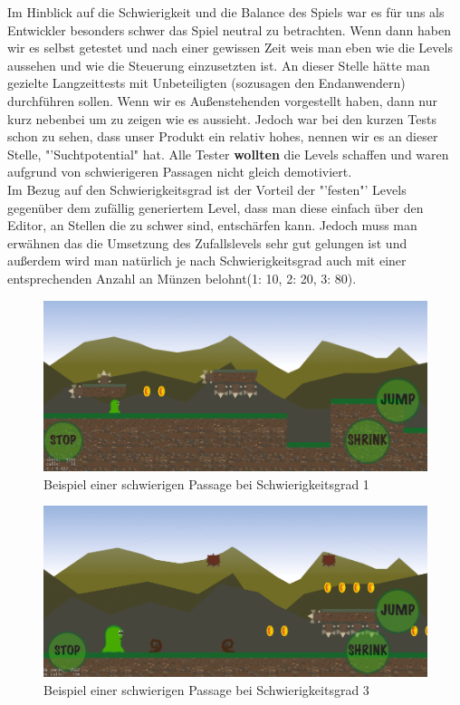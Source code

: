 Im Hinblick auf die Schwierigkeit und die Balance des Spiels war es für uns als Entwickler besonders schwer das Spiel neutral zu betrachten. Wenn dann haben wir es selbst getestet und nach einer gewissen Zeit weis man eben wie die Levels aussehen und wie die Steuerung einzusetzten ist. An dieser Stelle hätte man gezielte Langzeittests mit Unbeteiligten (sozusagen den Endanwendern) durchführen sollen. Wenn wir es Außenstehenden vorgestellt haben, dann nur kurz nebenbei um zu zeigen wie es aussieht.
Jedoch war bei den kurzen Tests schon zu sehen, dass unser Produkt ein relativ hohes, nennen wir es an dieser Stelle, "'Suchtpotential" hat. Alle Tester \textbf{wollten} die Levels schaffen und waren aufgrund von schwierigeren Passagen nicht gleich demotiviert.
\\Im Bezug auf den Schwierigkeitsgrad ist der Vorteil der "'festen"' Levels gegenüber dem zufällig generiertem Level, dass man diese einfach über den Editor, an Stellen die zu schwer sind, entschärfen kann. Jedoch muss man erwähnen das die Umsetzung des Zufallslevels sehr gut gelungen ist und außerdem wird man natürlich je nach Schwierigkeitsgrad auch mit einer entsprechenden Anzahl an Münzen belohnt(1: 10, 2: 20, 3: 80).

\begin{figure}[H]
\centering
\includegraphics[width= \textwidth]{resources/randomdiff1}
\caption{Beispiel einer schwierigen Passage bei Schwierigkeitsgrad 1}
\label{fig: randomdiff1}
\end{figure}


\begin{figure}[H]
\centering
\includegraphics[width= \textwidth]{resources/randomdiff3}
\caption{Beispiel einer schwierigen Passage bei Schwierigkeitsgrad 3}
\label{fig: randomdiff3}
\end{figure}

